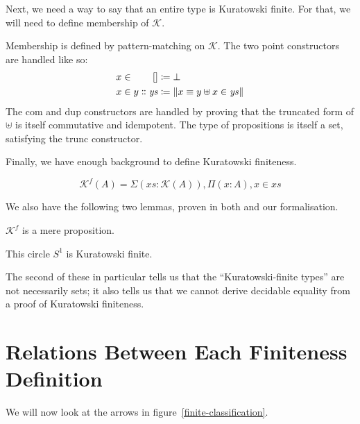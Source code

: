 Next, we need a way to say that an entire type is Kuratowski finite.
For that, we will need to define membership of \(\mathcal{K}\).
\begin{romdefinition}
  Membership is defined by pattern-matching on \(\mathcal{K}\).
  The two point constructors are handled like so:
  \begin{equation}
    \begin{alignedat}{2}
      x \in&& \; []                      &\coloneqq \bot \\
      x \in&& \; y \dblcolon \mathit{ys} &\coloneqq \lVert x \equiv y \uplus x \in \mathit{ys} \rVert
    \end{alignedat}
  \end{equation}
  The \(\text{com}\) and \(\text{dup}\) constructors are handled by proving that
  the truncated form of \(\uplus\) is itself commutative and idempotent.
  The type of propositions is itself a set, satisfying the \(\text{trunc}\)
  constructor.
\end{romdefinition}
Finally, we have enough background to define Kuratowski finiteness.
\begin{romdefinition}
  \begin{equation}
    \mathcal{K}^{f}(A) = \Sigma {(\mathit{xs} : \mathcal{K}(A))} , \Pi (x : A) , x \in \mathit{xs}
  \end{equation}
\end{romdefinition}

We also have the following two lemmas, proven in both
\cite{fruminFiniteSetsHomotopy2018} and our formalisation.
\begin{romlemma}
  \(\mathcal{K}^f\) is a mere proposition.
\end{romlemma}
\begin{romlemma}
  This circle \(S^1\) is Kuratowski finite.
\end{romlemma}
The second of these in particular tells us that the ``Kuratowski-finite types''
are not necessarily sets; it also tells us that we cannot derive decidable
equality from a proof of Kuratowski finiteness.
\section{Relations Between Each Finiteness Definition} \label{relations}
We will now look at the arrows in figure~\ref{finite-classification}.

